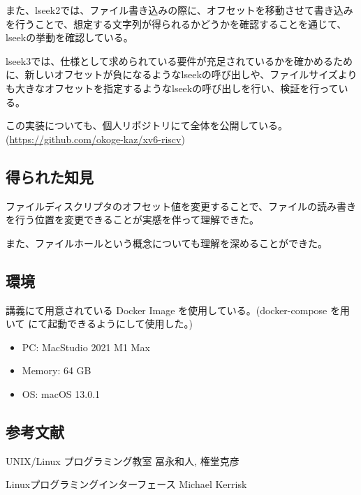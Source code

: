 \documentclass[platex,dvipdfmx, titlepage]{jlreq} %
\begin{document}
また、lseek2では、ファイル書き込みの際に、オフセットを移動させて書き込みを行うことで、想定する文字列が得られるかどうかを確認することを通じて、lseekの挙動を確認している。

lseek3では、仕様として求められている要件が充足されているかを確かめるために、新しいオフセットが負になるようなlseekの呼び出しや、ファイルサイズよりも大きなオフセットを指定するようなlseekの呼び出しを行い、検証を行っている。

この実装についても、個人リポジトリにて全体を公開している。(\url{https://github.com/okoge-kaz/xv6-riscv})

\subsection{得られた知見}

ファイルディスクリプタのオフセット値を変更することで、ファイルの読み書きを行う位置を変更できることが実感を伴って理解できた。

また、ファイルホールという概念についても理解を深めることができた。

\subsection{環境}

講義にて用意されている Docker Image を使用している。(docker-compose を用いて にて起動できるようにして使用した。)

\begin{itemize}
    \item PC: MacStudio 2021 M1 Max
    \item Memory: 64 GB
    \item OS: macOS 13.0.1
\end{itemize}

\subsection{参考文献}

UNIX/Linux プログラミング教室 冨永和人, 権堂克彦

Linuxプログラミングインターフェース Michael Kerrisk
\end{document}
